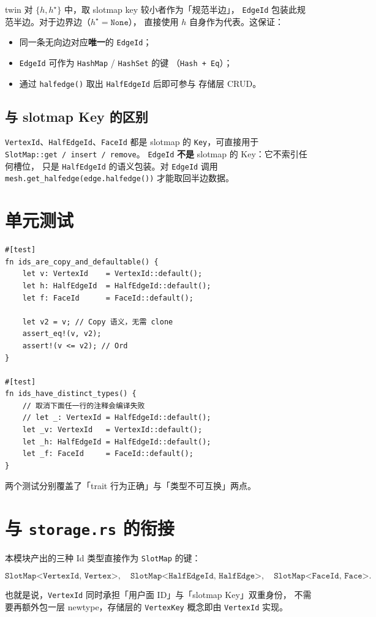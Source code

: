 \documentclass[11pt,a4paper]{article}
\begin{document}
twin 对 $\{h, h^\star\}$ 中，取 slotmap key 较小者作为「规范半边」，
\texttt{EdgeId} 包装此规范半边。对于边界边（$h^\star = \texttt{None}$），
直接使用 $h$ 自身作为代表。这保证：

\begin{itemize}
  \item 同一条无向边对应\textbf{唯一}的 \texttt{EdgeId}；
  \item \texttt{EdgeId} 可作为 \texttt{HashMap} / \texttt{HashSet} 的键
        （\texttt{Hash + Eq}）；
  \item 通过 \texttt{halfedge()} 取出 \texttt{HalfEdgeId} 后即可参与
        存储层 CRUD。
\end{itemize}

\subsection{与 slotmap Key 的区别}

\texttt{VertexId}、\texttt{HalfEdgeId}、\texttt{FaceId} 都是 slotmap 的
\texttt{Key}，可直接用于 \texttt{SlotMap::get / insert / remove}。
\texttt{EdgeId} \textbf{不是} slotmap 的 Key：它不索引任何槽位，
只是 \texttt{HalfEdgeId} 的语义包装。对 \texttt{EdgeId} 调用
\texttt{mesh.get\_halfedge(edge.halfedge())} 才能取回半边数据。

\section{单元测试}

\begin{lstlisting}
#[test]
fn ids_are_copy_and_defaultable() {
    let v: VertexId    = VertexId::default();
    let h: HalfEdgeId  = HalfEdgeId::default();
    let f: FaceId      = FaceId::default();

    let v2 = v; // Copy 语义，无需 clone
    assert_eq!(v, v2);
    assert!(v <= v2); // Ord
}

#[test]
fn ids_have_distinct_types() {
    // 取消下面任一行的注释会编译失败
    // let _: VertexId = HalfEdgeId::default();
    let _v: VertexId   = VertexId::default();
    let _h: HalfEdgeId = HalfEdgeId::default();
    let _f: FaceId     = FaceId::default();
}
\end{lstlisting}

两个测试分别覆盖了「trait 行为正确」与「类型不可互换」两点。

\section{与 \texttt{storage.rs} 的衔接}

本模块产出的三种 Id 类型直接作为 \texttt{SlotMap} 的键：

\[
\texttt{SlotMap<VertexId, Vertex>},\quad
\texttt{SlotMap<HalfEdgeId, HalfEdge>},\quad
\texttt{SlotMap<FaceId, Face>}.
\]

也就是说，\texttt{VertexId} 同时承担「用户面 ID」与「slotmap Key」双重身份，
不需要再额外包一层 newtype，存储层的 \texttt{VertexKey} 概念即由 \texttt{VertexId} 实现。
\end{document}
